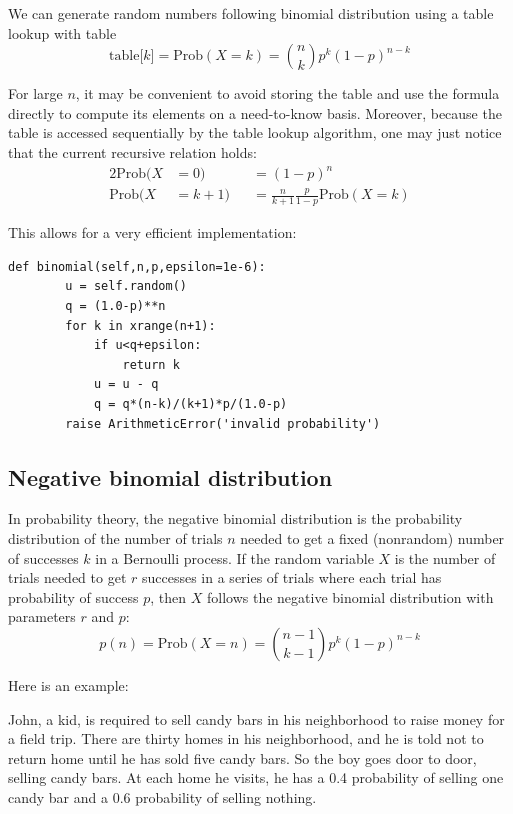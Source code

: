 \documentclass[justified,sixbynine]{tufte-book}
\def\ft{\small\tt}
\theoremstyle{plain}%
\theoremstyle{definition}
\theoremstyle{remark}
\begin{document}
\begin{fullwidth}
We can generate random numbers following binomial distribution using a table lookup with table
\begin{equation}
\text{table[}k\text{]}=\textrm{Prob}(X=k)=\binom nkp^k(1-p)^{n-k}
\end{equation}

For large $n$, it may be convenient to avoid storing the table and use the
formula directly to compute its elements on a need-to-know basis.
Moreover, because the table is accessed sequentially by the
table lookup algorithm, one may just notice that the current recursive relation holds:
\begin{alignat}{2}
\textrm{Prob}(X &= 0) &&= (1-p)^n \\
\textrm{Prob}(X &= k+1) &&= \frac n{k+1}\frac p{1-p}\textrm{Prob}(X=k)
\end{alignat}

This allows for a very efficient implementation:

\begin{lstlisting}[caption={in file: {\ft nlib.py}}]
    def binomial(self,n,p,epsilon=1e-6):
        u = self.random()
        q = (1.0-p)**n
        for k in xrange(n+1):
            if u<q+epsilon:
                return k
            u = u - q
            q = q*(n-k)/(k+1)*p/(1.0-p)
        raise ArithmeticError('invalid probability')
\end{lstlisting}


\goodbreak\subsection{Negative binomial distribution}

In probability theory, the negative binomial distribution is the probability
distribution of the number of trials $n$ needed to get a fixed
(nonrandom) number of successes $k$ in a Bernoulli process. If the random
variable $X$ is the number of trials needed to get $r$ successes in a series of
trials where each trial has probability of success $p$, then $X$ follows the
negative binomial distribution with parameters $r$ and $p$:
\begin{equation}
p(n)=\textrm{Prob}(X=n)=\binom{n-1}{k-1}p^k(1-p)^{n-k}
\end{equation}

Here is an example:

John, a kid, is required to sell candy bars in his neighborhood to
raise money for a field trip. There are thirty homes in his
neighborhood, and he is told not to return home until he has sold five candy bars.
So the boy goes door to door, selling candy bars. At each home he visits, he
has a 0.4 probability of selling one candy bar and a 0.6 probability of
selling nothing.


\end{fullwidth}
\end{document}
